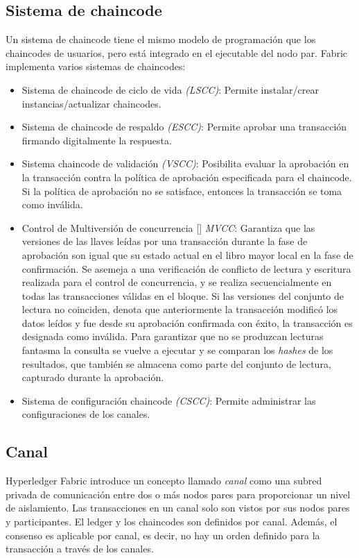 \subsection{Sistema de chaincode}
Un sistema de chaincode tiene el mismo modelo de programaci\'on que los chaincodes de usuarios, pero est\'a integrado en el ejecutable del nodo par. Fabric implementa varios sistemas de chaincodes:
\begin{itemize}
\item Sistema de chaincode de ciclo de vida \emph{(LSCC)}: Permite instalar/crear instancias/actualizar chaincodes.

\item Sistema de chaincode de respaldo \emph{(ESCC)}: Permite aprobar una transacci\'on firmando digitalmente la respuesta.

\item Sistema chaincode de validaci\'on \emph{(VSCC)}: Posibilita evaluar la aprobaci\'on en la transacci\'on contra la pol\'itica de aprobaci\'on especificada para el chaincode. Si la pol\'itica de aprobaci\'on no se satisface, entonces la transacci\'on se toma como inv\'alida.

\item Control de Multiversi\'on de concurrencia [\cite{papadimitriou1984concurrency}] \emph{MVCC}: Garantiza que las versiones de las llaves le\'idas por una transacci\'on durante la fase de aprobaci\'on son igual que su estado actual en el libro mayor local en la fase de confirmaci\'on. Se asemeja a una verificaci\'on de conflicto de lectura y escritura realizada para el control de concurrencia, y se realiza secuencialmente en todas las transacciones v\'alidas en el bloque. Si las versiones del conjunto de lectura no coinciden, denota que anteriormente la transacci\'on modific\'o los datos le\'idos y fue desde su aprobaci\'on confirmada con \'exito, la transacci\'on es designada como inv\'alida. Para garantizar que no se produzcan lecturas fantasma la consulta se vuelve a ejecutar y se comparan los \emph{hashes} de los resultados, que tambi\'en se almacena como parte del conjunto de lectura, capturado durante la aprobaci\'on.

\item Sistema de configuraci\'on chaincode \emph{(CSCC)}: Permite administrar las configuraciones de los canales.
\end{itemize}


\subsection{Canal}
Hyperledger Fabric introduce un concepto llamado \emph{canal} como una subred privada de comunicaci\'on entre dos o m\'as nodos pares para proporcionar un nivel de aislamiento. Las transacciones en un canal solo son vistos por sus nodos pares y participantes. El ledger y los chaincodes son definidos por canal. Adem\'as, el consenso es aplicable por canal, es decir, no hay un orden definido para la transacci\'on a trav\'es de los canales.

